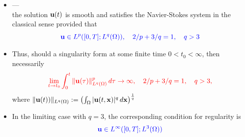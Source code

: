 \documentclass{beamer}
\def\Bmp#1{ \begin{minipage}{#1} }
\def\Emp{ \end{minipage} }
\def\red#1{{\color{red}{ #1 }}}
\def\blue#1{{\color{blue}{ #1 }}}
\def\x{{\bf x}}
\def\u{{\bf u}}
\begin{document}
\frame
{
\hspace*{-1.0cm}
\Bmp{12cm}
\raggedright


\begin{itemize}
\item<1-> \blue{\sc The Ladyzhenskaya-Prodi-Serrin (LPS) conditions}
  --- \\ the solution $\u(t)$ is smooth and satisfies the
  Navier-Stokes system in the classical sense provided that
\begin{equation*}
\blue{\u \in L^p([0,T];L^q(\Omega)), \quad 2/p+3/q = 1, \quad q > 3}
\end{equation*}

\item<2->  Thus, should a singularity form 
at some finite time $0 < t_0 < \infty$, then necessarily \\ \vspace*{-0.3cm}
\begin{equation*}
\red{\lim_{t \rightarrow t_0} \int_0^t \| \u(\tau) \|_{L^q(\Omega)}^p \, d\tau \rightarrow \infty, \quad 2/p+3/q = 1, \quad q > 3,} \vspace*{-0.2cm}
\end{equation*}
where \quad $\|\u(t))\|_{L^q(\Omega)}  := \left( \int_\Omega |\u(t,\x)|^q \,d\x \right)^{\frac{1}{q}}$ 

\bigskip
\item<3->
In the  limiting case with $q = 3$, the corresponding condition for regularity is
\begin{equation*}
\blue{\u \in L^{\infty}([0,T];L^3(\Omega))}
\end{equation*}


\end{itemize}

\Emp
}


\end{document}
